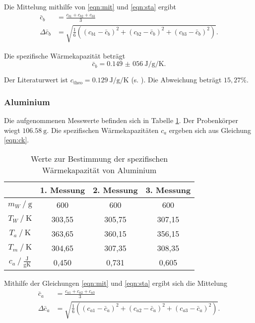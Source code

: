 Die Mittelung mithilfe von \eqref{eqn:mit} und \eqref{eqn:sta} ergibt
\begin{align*}
  \bar{c}_b &= \frac{c_{b1}+c_{b2}+c_{b3}}{3} \\
  \Delta \bar{c}_b &= \sqrt{\frac{1}{6} \left((c_{b1}-\bar{c}_b)^2 + (c_{b2}-\bar{c}_b)^2 + (c_{b3}-\bar{c}_b)^2 \right)}.
\end{align*}

Die spezifische Wärmekapazität beträgt
\begin{equation*}
  \bar{c}_b = \SI{0,149(056)}{\joule \per \gram \per \kelvin}.
\end{equation*}

Der Literaturwert ist $c_\text{theo} = \SI{0,129}{\joule \per \gram \per \kelvin}$ (s. \cite{sample2}).
Die Abweichung beträgt $15,27 \%$.

\subsubsection{Aluminium}
Die aufgenommenen Messwerte befinden sich in Tabelle \ref{tab:alu}. Der Probenkörper wiegt $\SI{106,58}{\g}$.
Die spezifischen Wärmekapazitäten $c_a$ ergeben sich aus Gleichung \eqref{eqn:ck}.
\begin{table}[H]
  \centering
  \caption{Werte zur Bestimmung der spezifischen Wärmekapazität von Aluminium}
  \label{tab:alu}
  \begin{tabular}{c c c c}
    \toprule
       & {1. Messung} & {2. Messung} & {3. Messung}\\
    \midrule
      $m_W \:/\: \mathrm{g}$ & 600 & 600 & 600 \\
      $T_W \:/\: \mathrm{K}$ & 303,55 & 305,75 & 307,15 \\
      $T_a \:/\: \mathrm{K}$ & 363,65 & 360,15 & 356,15 \\
      $T_m \:/\: \mathrm{K}$ & 304,65 & 307,35 & 308,35 \\
      $c_a \:/\: \mathrm{\frac{J}{g K}}$ & 0,450 & 0,731 & 0,605 \\
    \bottomrule
  \end{tabular}
\end{table}

Mithilfe der Gleichungen \eqref{eqn:mit} und \eqref{eqn:sta} ergibt sich die Mittelung
\begin{align*}
  \bar{c}_a &= \frac{c_{a1}+c_{a2}+c_{a3}}{3} \\
  \Delta \bar{c}_a &= \sqrt{\frac{1}{6} \left((c_{a1}-\bar{c}_a)^2 + (c_{a2}-\bar{c}_a)^2 + (c_{a3}-\bar{c}_a)^2 \right)}.
\end{align*}

